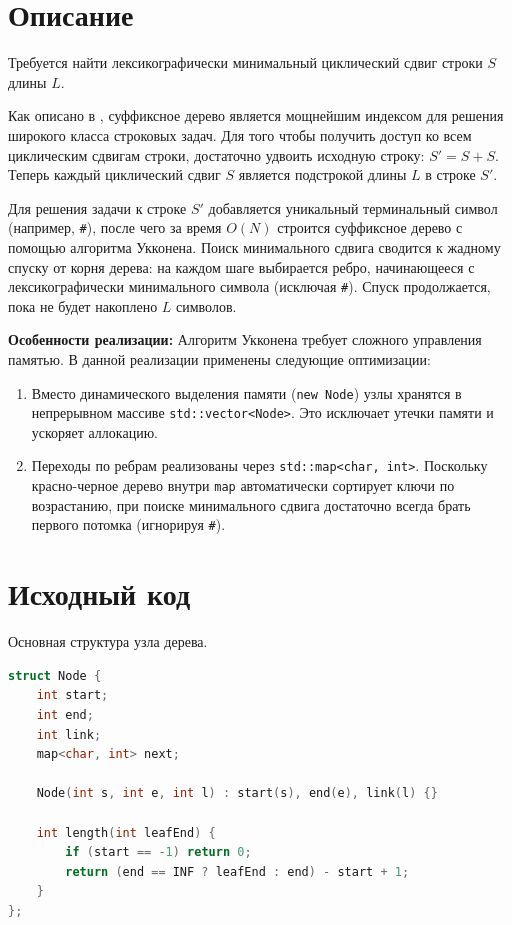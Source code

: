 \section{Описание}
Требуется найти лексикографически минимальный циклический сдвиг строки $S$ длины $L$.

Как описано в \cite{Gasfield}, суффиксное дерево является мощнейшим индексом для решения широкого класса строковых задач. Для того чтобы получить доступ ко всем циклическим сдвигам строки, достаточно удвоить исходную строку: $S' = S + S$. Теперь каждый циклический сдвиг $S$ является подстрокой длины $L$ в строке $S'$.

Для решения задачи к строке $S'$ добавляется уникальный терминальный символ (например, \texttt{\#}), после чего за время $O(N)$ строится суффиксное дерево с помощью алгоритма Укконена. 
Поиск минимального сдвига сводится к жадному спуску от корня дерева: на каждом шаге выбирается ребро, начинающееся с лексикографически минимального символа (исключая \texttt{\#}). Спуск продолжается, пока не будет накоплено $L$ символов.

\textbf{Особенности реализации:}
Алгоритм Укконена требует сложного управления памятью. В данной реализации применены следующие оптимизации:
\begin{enumerate}
\item Вместо динамического выделения памяти (\texttt{new Node}) узлы хранятся в непрерывном массиве \texttt{std::vector<Node>}. Это исключает утечки памяти и ускоряет аллокацию.
\item Переходы по ребрам реализованы через \texttt{std::map<char, int>}. Поскольку красно-черное дерево внутри \texttt{map} автоматически сортирует ключи по возрастанию, при поиске минимального сдвига достаточно всегда брать первого потомка (игнорируя \texttt{\#}).
\end{enumerate}

\section{Исходный код}
Основная структура узла дерева.

\begin{lstlisting}[language=C++]
struct Node {
    int start;
    int end;
    int link;
    map<char, int> next;

    Node(int s, int e, int l) : start(s), end(e), link(l) {}

    int length(int leafEnd) {
        if (start == -1) return 0;
        return (end == INF ? leafEnd : end) - start + 1;
    }
};
\end{lstlisting}

